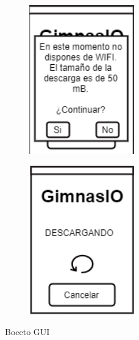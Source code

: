 \documentclass[11pt,a4paper]{report}
\begin{document}
\begin{figure}[H]
	\begin{minipage}[b]{0.5\linewidth} %
		\begin{figure}[H]
			\centering
			\includegraphics[width=0.5\textwidth]{capturicas/guipbidownload1.png}
			\label{fig: guipbi1}
		\end{figure}
	\end{minipage}
	\hspace{0.2cm} %
	\begin{minipage}[b]{0.5\linewidth}
		\begin{figure}[H]
			\centering
			\includegraphics[width=0.5\textwidth]{capturicas/guipbidownload2.png}
			\label{fig: guipbi2}
		\end{figure}
	\end{minipage}
	\caption{Boceto GUI}
\end{figure}
\end{document}

